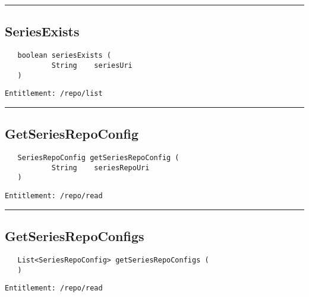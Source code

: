 \rule{12cm}{2pt}
\subsection{SeriesExists}
\label{Api:SeriesExists}
\begin{verbatim}
   boolean seriesExists (
           String    seriesUri
   )
\end{verbatim}
\begin{Verbatim}[fontsize=\small, formatcom=\color{Maroon}]
  Entitlement: /repo/list
\end{Verbatim}



\rule{12cm}{2pt}
\subsection{GetSeriesRepoConfig}
\label{Api:GetSeriesRepoConfig}
\begin{verbatim}
   SeriesRepoConfig getSeriesRepoConfig (
           String    seriesRepoUri
   )
\end{verbatim}
\begin{Verbatim}[fontsize=\small, formatcom=\color{Maroon}]
  Entitlement: /repo/read
\end{Verbatim}



\rule{12cm}{2pt}
\subsection{GetSeriesRepoConfigs}
\label{Api:GetSeriesRepoConfigs}
\begin{verbatim}
   List<SeriesRepoConfig> getSeriesRepoConfigs (
   )
\end{verbatim}
\begin{Verbatim}[fontsize=\small, formatcom=\color{Maroon}]
  Entitlement: /repo/read
\end{Verbatim}



